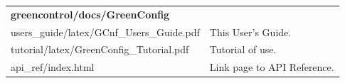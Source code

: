 \noindent
\begin{minipage}{\textwidth}
\begin{tabularx}{\textwidth}{|l|X|}
	\cline{1-1}\cline{2-2}\multicolumn{2}{|l|}{  {\bf\sffamily greencontrol/docs/GreenConfig}    }\\
	\cline{1-1}\cline{2-2}  users\_guide/latex/GCnf\_Users\_Guide.pdf &            This User's Guide.  \\
	\cline{1-1}\cline{2-2}  tutorial/latex/GreenConfig\_Tutorial.pdf &                 Tutorial of use.  \\
	\cline{1-1}\cline{2-2}  api\_ref/index.html &        Link page to API Reference. \\
	\hline
\end{tabularx}
\end{minipage}

\vspace{1 cm}

